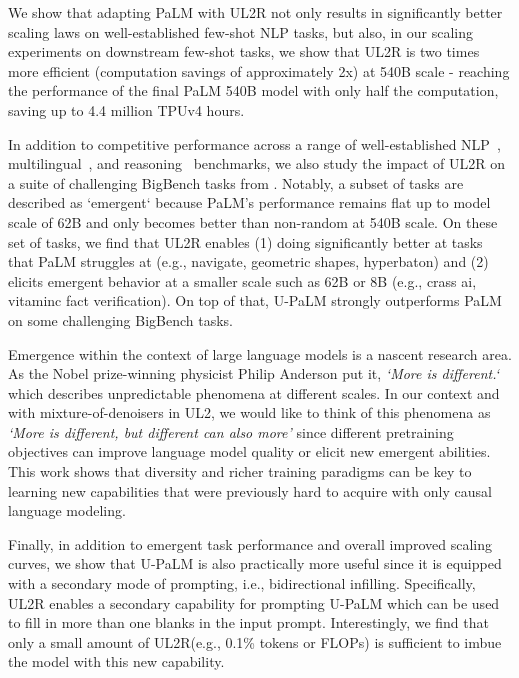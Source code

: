 \documentclass{article}
\newcommand{\methodname}{UL2R\xspace}
\newcommand{\modelname}{U-PaLM\xspace}
\begin{document}
We show that adapting PaLM with \methodname{} not only results in significantly better scaling laws on well-established few-shot NLP tasks, but also, in our scaling experiments on downstream few-shot tasks, we show that \methodname is two times more efficient (computation savings of approximately 2x) at 540B scale - reaching the performance of the final PaLM 540B model with only half the computation, saving up to 4.4 million TPUv4 hours. 

In addition to competitive performance across a range of well-established NLP~\citep{wang2019superglue}, multilingual~\citep{clark2020tydi,shi2022language}, and reasoning~\citep{cobbe2021training} benchmarks, we also study the impact of \methodname on a suite of challenging BigBench tasks from \citet{wei2022emergent}. Notably, a subset of tasks are described as `emergent` because PaLM's performance remains flat up to model scale of 62B and only becomes better than non-random at 540B scale. On these set of tasks, we find that \methodname enables (1) doing significantly better at tasks that PaLM struggles at (e.g., navigate, geometric shapes, hyperbaton) and (2) elicits emergent behavior at a smaller scale such as 62B or 8B (e.g., crass ai, vitaminc fact verification). On top of that, \modelname strongly outperforms PaLM on some challenging BigBench tasks.

Emergence within the context of large language models is a nascent research area. As the Nobel prize-winning physicist Philip Anderson put it, \textit{`More is different.`}~\citep{anderson1972more} which describes unpredictable phenomena at different scales. In our context and with mixture-of-denoisers in UL2, we would like to think of this phenomena as \textit{`More is different, but different can also more'} since different pretraining objectives can improve language model quality or elicit new emergent abilities. This work shows that diversity and richer training paradigms can be key to learning new capabilities that were previously hard to acquire with only causal language modeling.

Finally, in addition to emergent task performance and overall improved scaling curves, we show that \modelname is also practically more useful since it is equipped with a secondary mode of prompting, i.e., bidirectional infilling. Specifically, \methodname enables a secondary capability for prompting \modelname which can be used to fill in more than one blanks in the input prompt. Interestingly, we find that only a small amount of \methodname (e.g., 0.1\% tokens or FLOPs) is sufficient to imbue the model with this new capability.  
\end{document}
